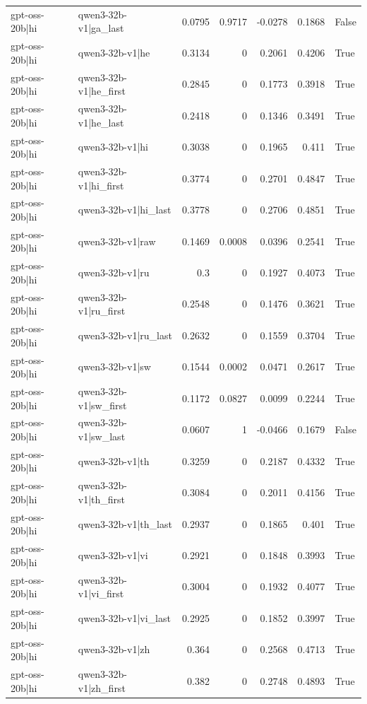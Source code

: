 \begin{table}
\begin{tabular}{l l r r r r l}
gpt-oss-20b|hi & qwen3-32b-v1|ga_last & 0.0795 & 0.9717 & -0.0278 & 0.1868 & False \\
gpt-oss-20b|hi & qwen3-32b-v1|he & 0.3134 & 0 & 0.2061 & 0.4206 & True \\
gpt-oss-20b|hi & qwen3-32b-v1|he_first & 0.2845 & 0 & 0.1773 & 0.3918 & True \\
gpt-oss-20b|hi & qwen3-32b-v1|he_last & 0.2418 & 0 & 0.1346 & 0.3491 & True \\
gpt-oss-20b|hi & qwen3-32b-v1|hi & 0.3038 & 0 & 0.1965 & 0.411 & True \\
gpt-oss-20b|hi & qwen3-32b-v1|hi_first & 0.3774 & 0 & 0.2701 & 0.4847 & True \\
gpt-oss-20b|hi & qwen3-32b-v1|hi_last & 0.3778 & 0 & 0.2706 & 0.4851 & True \\
gpt-oss-20b|hi & qwen3-32b-v1|raw & 0.1469 & 0.0008 & 0.0396 & 0.2541 & True \\
gpt-oss-20b|hi & qwen3-32b-v1|ru & 0.3 & 0 & 0.1927 & 0.4073 & True \\
gpt-oss-20b|hi & qwen3-32b-v1|ru_first & 0.2548 & 0 & 0.1476 & 0.3621 & True \\
gpt-oss-20b|hi & qwen3-32b-v1|ru_last & 0.2632 & 0 & 0.1559 & 0.3704 & True \\
gpt-oss-20b|hi & qwen3-32b-v1|sw & 0.1544 & 0.0002 & 0.0471 & 0.2617 & True \\
gpt-oss-20b|hi & qwen3-32b-v1|sw_first & 0.1172 & 0.0827 & 0.0099 & 0.2244 & True \\
gpt-oss-20b|hi & qwen3-32b-v1|sw_last & 0.0607 & 1 & -0.0466 & 0.1679 & False \\
gpt-oss-20b|hi & qwen3-32b-v1|th & 0.3259 & 0 & 0.2187 & 0.4332 & True \\
gpt-oss-20b|hi & qwen3-32b-v1|th_first & 0.3084 & 0 & 0.2011 & 0.4156 & True \\
gpt-oss-20b|hi & qwen3-32b-v1|th_last & 0.2937 & 0 & 0.1865 & 0.401 & True \\
gpt-oss-20b|hi & qwen3-32b-v1|vi & 0.2921 & 0 & 0.1848 & 0.3993 & True \\
gpt-oss-20b|hi & qwen3-32b-v1|vi_first & 0.3004 & 0 & 0.1932 & 0.4077 & True \\
gpt-oss-20b|hi & qwen3-32b-v1|vi_last & 0.2925 & 0 & 0.1852 & 0.3997 & True \\
gpt-oss-20b|hi & qwen3-32b-v1|zh & 0.364 & 0 & 0.2568 & 0.4713 & True \\
gpt-oss-20b|hi & qwen3-32b-v1|zh_first & 0.382 & 0 & 0.2748 & 0.4893 & True \\

\end{tabular}
\end{table}
